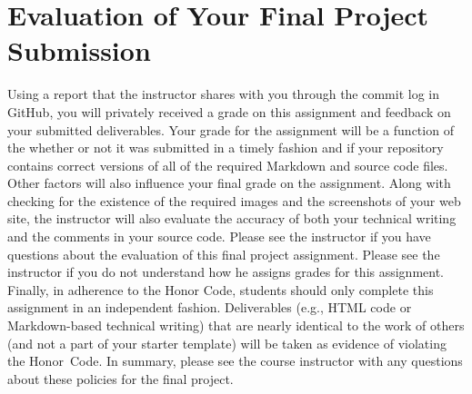 \documentclass[11pt]{article}
\begin{document}
\vspace*{-.1in}

\section*{Evaluation of Your Final Project Submission}

Using a report that the instructor shares with you through the commit log in
GitHub, you will privately received a grade on this assignment and feedback on
your submitted deliverables. Your grade for the assignment will be a function of
the whether or not it was submitted in a timely fashion and if your repository
contains correct versions of all of the required Markdown and source code files.
Other factors will also influence your final grade on the assignment. Along with
checking for the existence of the required images and the screenshots of your
web site, the instructor will also evaluate the accuracy of both your technical
writing and the comments in your source code. Please see the instructor if you
have questions about the evaluation of this final project assignment.
%
Please see the instructor if you do not understand how he assigns grades for
this assignment. Finally, in adherence to the Honor Code, students should only
complete this assignment in an independent fashion. Deliverables (e.g., HTML
code or Markdown-based technical writing) that are nearly identical to the work
of others (and not a part of your starter template) will be taken as evidence of
violating the \mbox{Honor Code}. In summary, please see the course instructor
with any questions about these policies for the final project.
\end{document}
